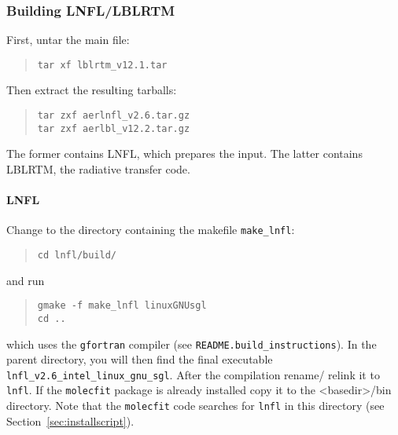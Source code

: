 \subsubsection{Building LNFL/LBLRTM}\label{sec:lbl_installation}
First, untar the main file:
\begin{quote}
  \begin{small}
    \begin{verbatim}
tar xf lblrtm_v12.1.tar
    \end{verbatim}
  \end{small}
\end{quote}
Then extract the resulting tarballs:
\begin{quote}
  \begin{small}
    \begin{verbatim}
tar zxf aerlnfl_v2.6.tar.gz
tar zxf aerlbl_v12.2.tar.gz
    \end{verbatim}
  \end{small}
\end{quote}
The former contains \ac{LNFL}, which prepares the input. The latter contains
\ac{LBLRTM}, the radiative transfer code.

\paragraph*{LNFL}
Change to the directory containing the makefile \verb|make_lnfl|:
\begin{quote}
  \begin{small}
    \begin{verbatim}
cd lnfl/build/
    \end{verbatim}
  \end{small}
\end{quote}
and run
\begin{quote}
  \begin{small}
    \begin{verbatim}
gmake -f make_lnfl linuxGNUsgl
cd ..
    \end{verbatim}
  \end{small}
\end{quote}
which uses the {\tt gfortran} compiler (see
\verb|README.build_instructions|). In the parent directory, you will then
find the final executable \verb|lnfl_v2.6_intel_linux_gnu_sgl|. After the
compilation rename/ relink it to \verb|lnfl|. If the \verb|molecfit| package
is already installed copy it to the <basedir>/bin directory. Note that the
\verb|molecfit| code searches for \verb|lnfl| in this directory (see
Section~\ref{sec:installscript}).

